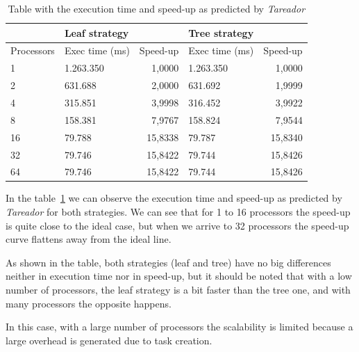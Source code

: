 \begin{table}[H]
\centering
\begin{tabular}{llrlr}
\toprule
           & Leaf strategy &           & Tree strategy &           \\
\midrule
Processors & Exec time (ms)& Speed-up  & Exec time (ms)& Speed-up  \\
\midrule
1          & 1.263.350     & 1,0000    & 1.263.350     & 1,0000    \\
2          & 631.688       & 2,0000    & 631.692       & 1,9999    \\
4          & 315.851       & 3,9998    & 316.452       & 3,9922    \\
8          & 158.381       & 7,9767    & 158.824       & 7,9544    \\
16         & 79.788        & 15,8338   & 79.787        & 15,8340   \\
32         & 79.746        & 15,8422   & 79.744        & 15,8426   \\
64         & 79.746        & 15,8422   & 79.744        & 15,8426   \\
\bottomrule
\end{tabular}
\caption{Table with the execution time and speed-up as predicted by \emph{Tareador}} 
\label{tab:Exec_time-Speed-up}
\end{table}

In the table~\ref{tab:Exec_time-Speed-up} we can observe the execution time and speed-up as predicted by \emph{Tareador} for both strategies. We can see that for 1 to 16 processors the speed-up is quite close to the ideal case, but when we arrive to 32 processors the speed-up curve flattens away from the ideal line.

As shown in the table, both strategies (leaf and tree) have no big differences neither in execution time nor in speed-up, but it should be noted that with a low number of processors, the leaf strategy is a bit faster than the tree one, and with many processors the opposite happens.

In this case, with a large number of processors the scalability is limited because a large overhead is generated due to task creation. %

